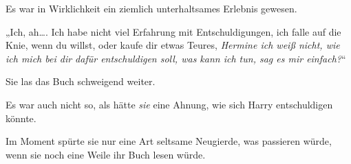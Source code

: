 Es war in Wirklichkeit ein ziemlich unterhaltsames Erlebnis gewesen.

„Ich, ah…. Ich habe nicht viel Erfahrung mit Entschuldigungen, ich falle auf die Knie, wenn du willst, oder kaufe dir etwas Teures, \emph{Hermine ich weiß nicht, wie ich mich bei dir dafür entschuldigen soll, was kann ich tun, sag es mir einfach?}“

Sie las das Buch schweigend weiter.

Es war auch nicht so, als hätte \emph{sie} eine Ahnung, wie sich Harry entschuldigen könnte.

Im Moment spürte sie nur eine Art seltsame Neugierde, was passieren würde, wenn sie noch eine Weile ihr Buch lesen würde.

